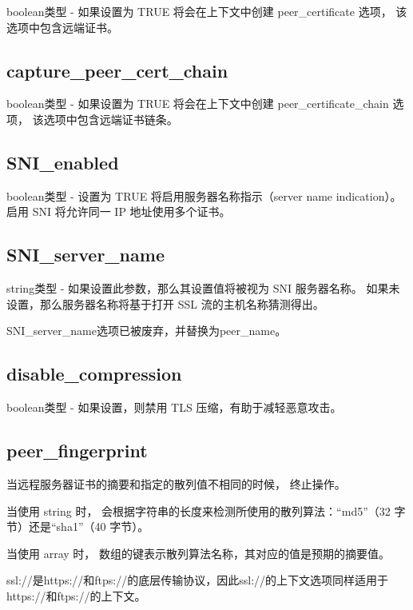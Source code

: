 boolean类型 - 如果设置为 TRUE 将会在上下文中创建 peer\_certificate 选项， 该选项中包含远端证书。


\subsection{capture\_peer\_cert\_chain}

boolean类型 - 如果设置为 TRUE 将会在上下文中创建 peer\_certificate\_chain 选项， 该选项中包含远端证书链条。


\subsection{SNI\_enabled}

boolean类型 - 设置为 TRUE 将启用服务器名称指示（server name indication）。 启用 SNI 将允许同一 IP 地址使用多个证书。



\subsection{SNI\_server\_name}

string类型 - 如果设置此参数，那么其设置值将被视为 SNI 服务器名称。 如果未设置，那么服务器名称将基于打开 SSL 流的主机名称猜测得出。

SNI\_server\_name选项已被废弃，并替换为peer\_name。

\subsection{disable\_compression}

boolean类型 - 如果设置，则禁用 TLS 压缩，有助于减轻恶意攻击。

\subsection{peer\_fingerprint}

当远程服务器证书的摘要和指定的散列值不相同的时候， 终止操作。

\begin{compactitem}
\item 当使用 string 时， 会根据字符串的长度来检测所使用的散列算法：“md5”（32 字节）还是“sha1”（40 字节）。

\item 当使用 array 时， 数组的键表示散列算法名称，其对应的值是预期的摘要值。
\end{compactitem}

ssl://是https://和ftps://的底层传输协议，因此ssl://的上下文选项同样适用于https://和ftps://的上下文。



